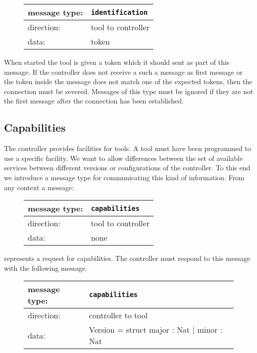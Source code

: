 \documentclass{article}
\newcommand{\msg}[1]{\texttt{#1}}
\begin{document}
   \begin{figure}[H]
    \begin{tabular}{|ll|}
     \hline
     message type:    & \msg{identification} \\
     \hline
     direction:       & tool to controller \\
     data:            & token \\
     \hline
    \end{tabular}
   \end{figure}

   \noindent When started the tool is given a token which it should sent as
   part of this message. If the controller does not receive a such a message as
   first message or the token inside the message does not match one of the
   expected tokens, then the connection must be severed. Messages of this type
   must be ignored if they are not the first message after the connection has
   been established.

  \subsection{Capabilities}

   The controller provides facilities for tools. A tool must have been
   programmed to use a specific facility. We want to allow differences between
   the set of available services between different versions or configurations
   of the controller. To this end we introduce a message type for communicating
   this kind of information. From any context a message:

   \begin{figure}[H]
    \begin{tabular}{|ll|}
     \hline
     message type:    & \msg{capabilities} \\
     \hline
     direction:       & tool to controller \\
     data:            & none \\
     \hline
    \end{tabular}
   \end{figure}

   \noindent represents a request for capabilities. The controller must respond
   to this message with the following message.

   \begin{figure}[H]
    \begin{tabular}{|ll|}
     \hline
      message type:   & \msg{capabilities} \\
     \hline
      direction:      & controller to tool \\
      data:           & Version = struct major : Nat $|$ minor : Nat \\
     \hline
    \end{tabular}
   \end{figure}
\end{document}
